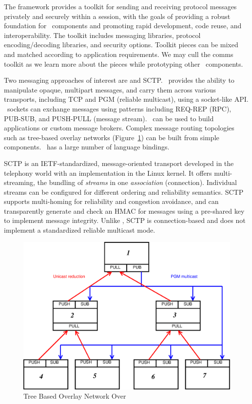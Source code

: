 The framework provides a toolkit for sending and receiving
protocol messages privately and securely within a session,
with the goals of providing a robust foundation for \ngrm\ components
and promoting rapid development, code reuse, and interoperability.
The toolkit includes messaging libraries,
protocol encoding/decoding libraries, and security options.
Toolkit pieces can be mixed and matched according to application
requirements.  We may cull the comms toolkit as we learn more
about the pieces while prototyping other \ngrm\ components.

Two messaging approaches of interest are \zMQ\cite{ZMQGuide} and
SCTP\cite{SCTP}.
\zMQ\ provides the ability to manipulate opaque, multipart messages,
and carry them across various transports, including TCP and
PGM\cite{rfc3208} (reliable multicast), using a socket-like API.
\zMQ\ sockets can exchange messages using patterns including
REQ-REP (RPC), PUB-SUB, and PUSH-PULL (message stream).
\zMQ\ can be used to build applications or custom message brokers.
Complex message routing topologies such as tree-based overlay networks
(Figure~\ref{FigZmqTBON}) can be built from simple components.
\zMQ\ has a large number of language bindings.

SCTP is an IETF-standardized, message-oriented transport developed
in the telephony world with an implementation in the Linux kernel.
It offers multi-streaming, the bundling of {\em streams} in one
{\em association} (connection).  Individual streams can be configured for
different ordering and reliability semantics.  SCTP supports
multi-homing for reliability and congestion avoidance, and
can transparently generate and check an HMAC for messages using a
pre-shared key to implement message integrity.  Unlike \zMQ, SCTP is
connection-based and does not implement a standardized reliable multicast
mode.

\begin{figure}
\centering
\includegraphics[scale=0.35]{../fig/zmqtbon.eps}
\caption{Tree Based Overlay Network Over \zMQ}
\label{FigZmqTBON}
\end{figure}

